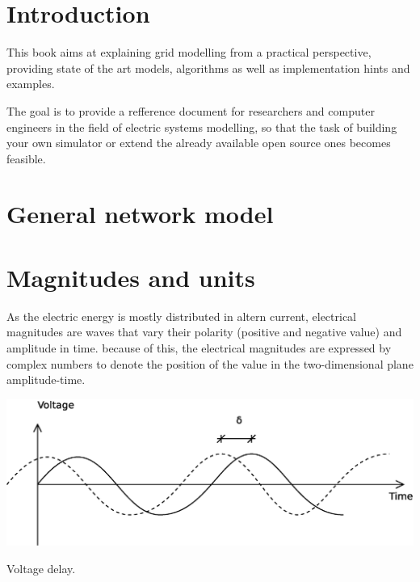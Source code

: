 \documentclass{tufte-book}
\begin{document}
\tableofcontents

\listoffigures

\listoftables


\chapter{Introduction}

This book aims at explaining grid modelling from a practical perspective, providing state of the art models, algorithms as well as implementation hints and examples.

The goal is to provide a refference document for researchers and computer engineers in the field of electric systems modelling, so that the task of building your own simulator or extend the already available open source ones becomes feasible.


\chapter{General network model}



\chapter{Magnitudes and units}



As the electric energy is mostly distributed in altern current, electrical magnitudes are waves that vary their polarity (positive and negative value) and amplitude in time. because of this, the electrical magnitudes are expressed by complex numbers to denote the position of the value in the two-dimensional plane amplitude-time. 

\begin{marginfigure}
  \includegraphics[width=\linewidth]{img/VoltageDelay.eps}
  \caption{Voltage delay.}
  \label{fig:vdelay}
\end{marginfigure}
\end{document}
